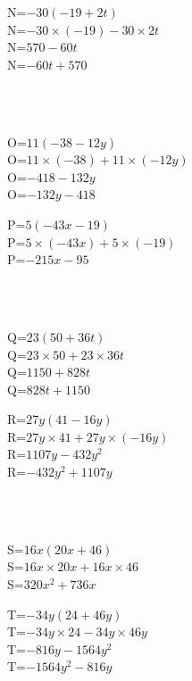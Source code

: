 \documentclass{article}%
\begin{document}
\begin{minipage}{0.5\textwidth}%
N=$-30(-19+2t)$\\%
N=$-30 \times (-19)-30 \times 2t$\\%
N=$570-60t$\\%
N=$-60t+570$\\%
\end{minipage}%
\\%
\\%
\begin{minipage}{0.5\textwidth}%
O=$11(-38-12y)$\\%
O=$11 \times (-38)+11 \times (-12y)$\\%
O=$-418-132y$\\%
O=$-132y-418$\\%
\end{minipage}%
\begin{minipage}{0.5\textwidth}%
P=$5(-43x-19)$\\%
P=$5 \times (-43x)+5 \times (-19)$\\%
P=$-215x-95$\\%
\end{minipage}%
\\%
\\%
\begin{minipage}{0.5\textwidth}%
Q=$23(50+36t)$\\%
Q=$23 \times 50+23 \times 36t$\\%
Q=$1150+828t$\\%
Q=$828t+1150$\\%
\end{minipage}%
\begin{minipage}{0.5\textwidth}%
R=$27y(41-16y)$\\%
R=$27y \times 41+27y \times (-16y)$\\%
R=$1107y-432y^2$\\%
R=$-432y^2+1107y$\\%
\end{minipage}%
\\%
\\%
\begin{minipage}{0.5\textwidth}%
S=$16x(20x+46)$\\%
S=$16x \times 20x+16x \times 46$\\%
S=$320x^2+736x$\\%
\end{minipage}%
\begin{minipage}{0.5\textwidth}%
T=$-34y(24+46y)$\\%
T=$-34y \times 24-34y \times 46y$\\%
T=$-816y-1564y^2$\\%
T=$-1564y^2-816y$\\%
\end{minipage}%
\\%
\\

%
\end{document}
